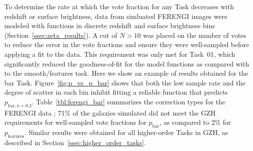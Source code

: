 \documentclass[twocolumn]{aastex6}
\begin{document}
To determine the rate at which the vote fraction for any Task decreases with redshift or surface brightness, data from simluated FERENGI images were modeled with functions in discrete redshift and surface brightness bins (Section~\ref{ssec:zeta_results}). A cut of $N>10$ was placed on the number of votes to reduce the error in the vote fractions and ensure they were well-sampled before applying a fit to the data. This requirement was only met for Task~01, which significantly reduced the goodness-of-fit for the model functions as compared with to the smooth/features task. Here we show an example of results obtained for the bar Task. Figure~\ref{fig:p_vs_p_bar} shows that both the low sample rate and the degree of scatter in each bin inhibit fitting a reliable function that predicts $p_\mathrm{bar,z=0.3}$. Table~\ref{tbl:ferengi_bar} summarizes the correction types for the FERENGI data ; 71\% of the galaxies simulated did not meet the GZH requirements for well-sampled vote fractions for $p_\mathrm{bar}$, as compared to 2\% for $p_\mathrm{features}$. Similar results were obtained for all higher-order Tasks in GZH, as described in Section~\ref{ssec:higher_order_tasks}.  
\end{document}
